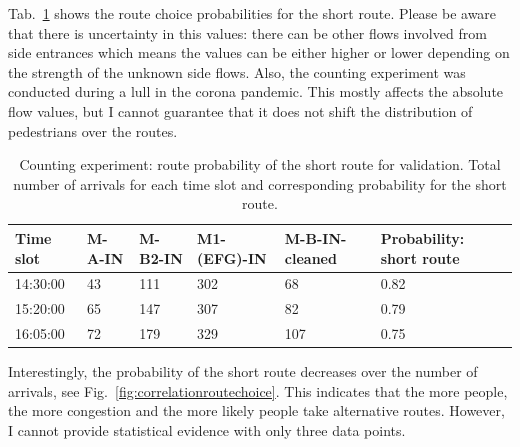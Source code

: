 Tab.~\ref{tab:appendixrouteprobscomp} shows the route choice probabilities for the short route. Please be aware that there is uncertainty in this values: there can be other flows involved from side entrances which means the values can be either higher or lower depending on the strength of the unknown side flows. Also, the counting experiment was conducted during a lull in the corona pandemic. This mostly affects the absolute flow values, but I cannot guarantee that it does not shift the distribution of pedestrians over the routes.





\begin{table}[hbt!]
\begin{tabular}{p{2cm}p{2cm}p{2cm}p{2cm}p{2cm}p{2cm}}
\toprule
Time slot &   M-A-IN &   M-B2-IN &   M1-(EFG)-IN &   M-B-IN-cleaned &  Probability: short route \\
\midrule
14:30:00  &       43 &       111 &           302 &               68 &    0.82 \\
15:20:00  &       65 &       147 &           307 &               82 &    0.79 \\
16:05:00  &       72 &       179 &           329 &              107 &    0.75 \\
\bottomrule
\end{tabular}
\caption[Counting experiment: route probability of the short route for validation]{Counting experiment: route probability of the short route for validation. Total number of arrivals for each time slot and corresponding probability for the short route.}
\label{tab:appendixrouteprobscomp}
\end{table}

Interestingly, the probability of the short route decreases over the number of arrivals, see Fig.~\ref{fig:correlationroutechoice}. This indicates that the more people, the more congestion and the more likely people take alternative routes.  However, I cannot provide statistical evidence with only three data points.

